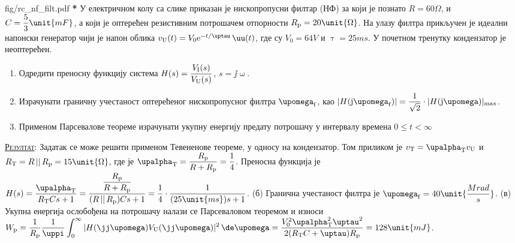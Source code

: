 \begin{slikaDesno}[0.833]{fig/rc_nf_filt.pdf}
\textbf{\color{red}*}\PID 
У електричном колу са слике 
приказан је нископропусни филтар
(НФ)
за који је познато
$R = {60}\unit{\Omega}$,  и 
${C = \dfrac{5}{3}\unit{mF}}
\vspace*{1mm}
$, а 
који је оптерећен резистивним потрошачем
отпорности
$R_{\rm p} = 20\unit{\Omega}
\vspace*{1mm}$. На улазу филтра прикључен 
је идеални напонски генератор чији 
је напон облика 
${v_{\rm U}(t) = V_0 
{\rm e}^{-t/\uptau}\,\uu(t)}$, где су
$V_0 = 64\unit{V}$ и 
$\uptau = 25\unit{ms}$. У почетном тренутку
кондензатор је неоптерећен.
\end{slikaDesno}

\begin{enumerate}[label=(\alph*)]
    \item Одредити преносну функцију система 
    $H(s) = \dfrac{V_{\rm I}(s)}{V_{\rm U}(s)}$, $s = \jj\upomega$.
    \item  
    Израчунати граничну учестаност 
    оптерећеног нископропусног
    филтра  $\upomega_{\rm f}$, као 
    $|H({\rm j}\upomega_{\rm f})| = \dfrac{1}{\sqrt 2} 
    \cdot |H({\rm j}\upomega)|_{\rm max}$.
    \item
    Применом Парсевалове теореме израчунати
    укупну енергију предату потрошачу 
    у интервалу времена $0 \leq t < \infty$
\end{enumerate} 

\textsc{\underline{Резултат}:} 
Задатак се може решити применом Тевененове теореме, у односу
на кондензатор. 
Том приликом је $v_{\rm T} = \upalpha_{\rm T} v_{\rm U}$ и
$R_{\rm T} = R\,||\,R_{\rm p} 
= 15\unit{\Omega}$, где је 
$\upalpha_{\rm T} = \dfrac{R_{\rm p}}{R + R_{\rm p}}
= \dfrac{1}{4}$. Преносна функција је 
$H(s) = \dfrac{\upalpha_{\rm T}}{
R_{\rm T}Cs + 1} =  
\dfrac{ \dfrac{R_{\rm p}}{R + R_{\rm p}} }{
(R\,||\,R_{\rm p})Cs + 1
} =
\dfrac{1}{4} \cdot
\dfrac{1}{  (25\unit{ms}) s + 1  }$. 
(б) Гранична учестаност филтра је 
$\upomega_{\rm f} = 40\unit{\dfrac{Mrad}{s}}$.
(в) Укупна енергија ослобођена на потрошачу 
налази се Парсеваловом теоремом и износи
$\displaystyle
W_{\rm p} = 
\dfrac{1}{R_{\rm p}}
\dfrac{1}{\uppi} 
\int_0^{\infty}
|H(\jj\upomega)V_{\rm U}(\jj\upomega)|^2\,
\de\upomega = 
\dfrac{V_0^2 \upalpha_{\rm T}^2 \uptau^2}{
2(R_{\rm T}C + \uptau)R_{\rm p}} = 
128\unit{mJ}
$.